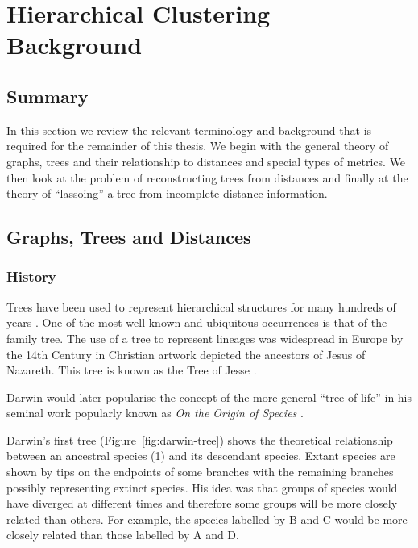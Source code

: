 \chapter{Hierarchical Clustering Background}
\label{cha:background2}

\section{Summary}
\label{sec:summary}

In this section we review the relevant terminology and background that is
required for the remainder of this thesis.  We begin with the general theory
of graphs, trees and their relationship to distances and special types of
metrics.  We then look at the problem of reconstructing trees from distances and
finally at the theory of ``lassoing'' a tree from incomplete distance
information.

\section{Graphs, Trees and Distances}
\label{sec:graphs-trees-dist}

\subsection{History}
\label{sec:history}

Trees have been used to represent hierarchical structures for many hundreds of
years \cite{knuth97taocp1}.  One of the most well-known and ubiquitous
occurrences is that of the family tree.  The use of a tree to represent
lineages was widespread in Europe by the 14th Century in Christian artwork
depicted the ancestors of Jesus of Nazareth.  This tree is known as the Tree
of Jesse \cite{corblet1860etude}.

Darwin would later popularise the concept of the more general ``tree of life''
in his seminal work popularly known as \textit{On the Origin of Species}
\cite{darwin1859origin}.

Darwin's first tree (Figure~\ref{fig:darwin-tree}) shows the theoretical
relationship between an ancestral species (1) and its descendant species.
Extant species are shown by tips on the endpoints of some branches with the
remaining branches possibly representing extinct species.  His idea was that
groups of species would have diverged at different times and therefore some
groups will be more closely related than others.  For example, the species
labelled by B and C would be more closely related than those labelled by A and
D.

